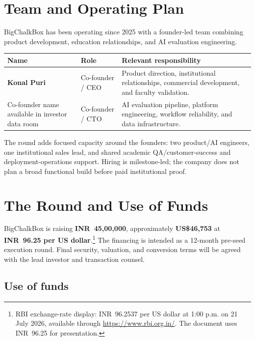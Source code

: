 \documentclass[11pt,a4paper]{article}
\newcommand{\rs}{INR}
\begin{document}
\section{Team and Operating Plan}

BigChalkBox has been operating since 2025 with a founder-led team combining product development, education relationships, and AI evaluation engineering.

\begin{tabularx}{\textwidth}{L{0.27\textwidth}L{0.25\textwidth}Y}
\toprule
\textbf{Name} & \textbf{Role} & \textbf{Relevant responsibility} \\
\midrule
\textbf{Konal Puri} & Co-founder / CEO & Product direction, institutional relationships, commercial development, and faculty validation. \\
Co-founder name available in investor data room & Co-founder / CTO & AI evaluation pipeline, platform engineering, workflow reliability, and data infrastructure. \\
\bottomrule
\end{tabularx}

The round adds focused capacity around the founders: two product/AI engineers, one institutional sales lead, and shared academic QA/customer-success and deployment-operations support. Hiring is milestone-led; the company does not plan a broad functional build before paid institutional proof.

\section{The Round and Use of Funds}

BigChalkBox is raising \textbf{\rs\ 45,00,000}, approximately \textbf{US\$46,753} at \textbf{\rs\ 96.25 per US dollar}.\footnote{RBI exchange-rate display: \rs\ 96.2537 per US dollar at 1:00 p.m. on 21 July 2026, available through \url{https://www.rbi.org.in/}. The document uses \rs\ 96.25 for presentation.} The financing is intended as a 12-month pre-seed execution round. Final security, valuation, and conversion terms will be agreed with the lead investor and transaction counsel.

\subsection{Use of funds}
\end{document}
